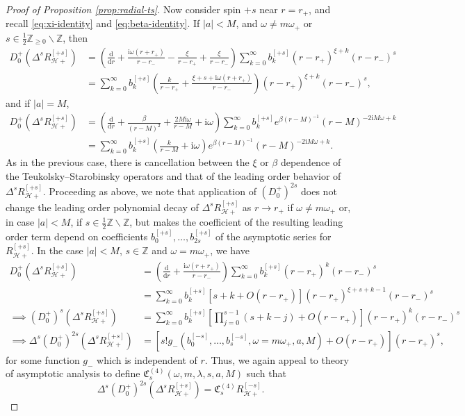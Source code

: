 \documentclass[11pt]{article}
\newcommand{\dd}{\mathrm{d}}
\newcommand{\ii}{\mathrm{i}}
\newcommand{\cH}{\mathcal H}
\numberwithin{equation}{section}
\begin{document}
\begin{proof}[Proof of Proposition \ref{prop:radial-ts}]
Now consider spin $+s$ near $r=r_+$, and recall \eqref{eq:xi-identity} and \eqref{eq:beta-identity}. If $|a|<M$, and $\omega\neq m\omega_+$ or $s\in\frac12\mathbb Z_{\geq 0}\backslash\mathbb Z$, then
\begin{align*}
D^+_0\left(\Delta^sR^{[+s]}_{\cH+}\right)
&=\left(\frac{\dd}{\dd r}+\frac{\ii\omega(r+r_+)}{r-r_-}-\frac{\xi}{r-r_+}+\frac{\xi}{r-r_-}\right)
\sum_{k=0}^{\infty}b^{[+s]}_k(r-r_+)^{\xi+k}(r-r_-)^s\\
&=\sum_{k=0}^{\infty}b^{[+s]}_k
\left(\frac{k}{r-r_+}+\frac{\xi+s+\ii\omega(r+r_+)}{r-r_-}\right)
(r-r_+)^{\xi+k}(r-r_-)^s,
\end{align*}
and if $|a|=M$,
\begin{align*}
D^+_0\left(\Delta^sR^{[+s]}_{\cH+}\right)
&=\left(\frac{\dd}{\dd r}+\frac{\beta}{(r-M)^2}+\frac{2M\ii\omega}{r-M}+\ii\omega\right)
\sum_{k=0}^{\infty}b^{[+s]}_ke^{\beta(r-M)^{-1}}(r-M)^{-2\ii M\omega+k}\\
&=\sum_{k=0}^{\infty}b^{[+s]}_k\left(\frac{k}{r-M}+\ii\omega\right)
 e^{\beta(r-M)^{-1}}(r-M)^{-2\ii M\omega+k}.
\end{align*}
As in the previous case, there is cancellation between the $\xi$ or $\beta$ dependence of the Teukolsky--Starobinsky operators and that of the leading order behavior of $\Delta^sR^{[+s]}_{\cH+}$. Proceeding as above, we note that application of $(D^+_0)^{2s}$ does not change the leading order polynomial decay of $\Delta^s R^{[+s]}_{\cH+}$ as $r\to r_+$ if $\omega\neq m\omega_+$ or, in case $|a|<M$, if $s\in\frac12\mathbb Z\backslash \mathbb Z$, but makes the coefficient of the resulting leading order term depend on coefficients $b^{[+s]}_0,\dots,b^{[+s]}_{2s}$ of the asymptotic series for $R^{[+s]}_{\cH+}$. In the case $|a|<M$, $s\in\mathbb Z$ and $\omega=m\omega_+$, we have
\begin{align*}
D^+_0\left(\Delta^sR^{[+s]}_{\cH+}\right)
&=\left(\frac{\dd}{\dd r}+\frac{\ii\omega(r+r_+)}{r-r_-}\right)
\sum_{k=0}^{\infty}b^{[+s]}_k(r-r_+)^{k}(r-r_-)^s\\
&=\sum_{k=0}^{\infty}b^{[+s]}_k\left[s+k+O(r-r_+)\right](r-r_+)^{\xi+s+k-1}(r-r_-)^s\\
\implies (D^+_0)^s\left(\Delta^sR^{[+s]}_{\cH+}\right)
&=\sum_{k=0}^{\infty}b^{[+s]}_k\left[\prod_{j=0}^{s-1}(s+k-j)+O(r-r_+)\right](r-r_+)^{k}(r-r_-)^s\\
\implies \Delta^s (D^+_0)^{2s}\left(\Delta^sR^{[+s]}_{\cH+}\right)
&=\left[s! g_-(b_0^{[-s]},\dots, b_s^{[-s]}, \omega=m\omega_+, a , M)+O(r-r_+)\right](r-r_+)^s,
\end{align*}
for some function $g_-$ which is independent of $r$. Thus, we again appeal to theory of asymptotic analysis to define $\mathfrak C^{(4)}_s(\omega,m,\lambda,s,a,M)$ such that
\begin{equation*}
\Delta^s(D^+_0)^{2s}\left(\Delta^sR^{[+s]}_{\cH+}\right)
=\mathfrak C^{(4)}_sR^{[-s]}_{\cH+}.
\end{equation*}


\end{proof}
\end{document}
